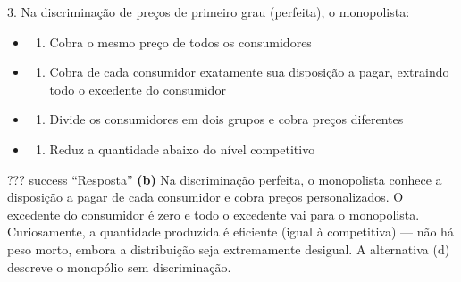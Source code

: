 \documentclass[11pt,twoside,openright]{book}
\providecommand{\tightlist}{\setlength{\itemsep}{0pt}\setlength{\parskip}{0pt}}
\begin{document}
\begin{infobox}{3. Na discriminação de preços de primeiro grau (perfeita), o monopolista:}

\begin{itemize}
\tightlist
\item
  \begin{enumerate}
  \def\labelenumi{(\alph{enumi})}
  \tightlist
  \item
    Cobra o mesmo preço de todos os consumidores
  \end{enumerate}
\item
  \begin{enumerate}
  \def\labelenumi{(\alph{enumi})}
  \setcounter{enumi}{1}
  \tightlist
  \item
    Cobra de cada consumidor exatamente sua disposição a pagar,
    extraindo todo o excedente do consumidor
  \end{enumerate}
\item
  \begin{enumerate}
  \def\labelenumi{(\alph{enumi})}
  \setcounter{enumi}{2}
  \tightlist
  \item
    Divide os consumidores em dois grupos e cobra preços diferentes
  \end{enumerate}
\item
  \begin{enumerate}
  \def\labelenumi{(\alph{enumi})}
  \setcounter{enumi}{3}
  \tightlist
  \item
    Reduz a quantidade abaixo do nível competitivo
  \end{enumerate}
\end{itemize}

??? success ``Resposta'' \textbf{(b)} Na discriminação perfeita, o
monopolista conhece a disposição a pagar de cada consumidor e cobra
preços personalizados. O excedente do consumidor é zero e todo o
excedente vai para o monopolista. Curiosamente, a quantidade produzida é
eficiente (igual à competitiva) --- não há peso morto, embora a
distribuição seja extremamente desigual. A alternativa (d) descreve o
monopólio sem discriminação.

\end{infobox}
\end{document}
